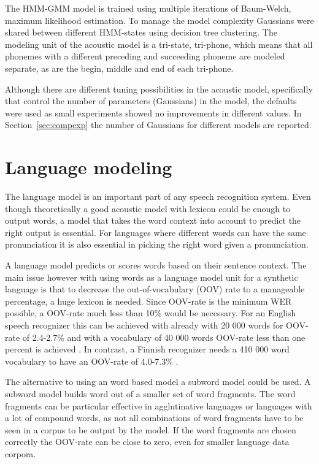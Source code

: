 \documentclass[b5paper]{article}
\newcommand{\ngram}{$n$-gram}
\begin{document}
The HMM-GMM model is trained using multiple iterations of Baum-Welch, maximum likelihood estimation. To manage the model complexity Gaussians were shared between different HMM-states using decision tree clustering. The modeling unit of the acoustic model is a tri-state, tri-phone, which means that all phonemes with a different preceding and succeeding phoneme are modeled separate, as are the begin, middle and end of each tri-phone.

Although there are different tuning possibilities in the acoustic model, specifically that control the number of parameters (Gaussians) in the model, the defaults were used as small experiments showed no improvements in different values. In Section~\ref{sec:compexp} the number of Gaussians for different models are reported.


\section{Language modeling}

The language model is an important part of any speech recognition system. Even though theoretically a good acoustic model with lexicon could be enough to output words, a model that takes the word context into account to predict the right output is essential. For languages where different words can have the same pronunciation it is also essential in picking the right word given a pronunciation. 


A language model predicts or scores words based on their sentence context. The main issue however with using words as a language model unit for a synthetic language is that to decrease the out-of-vocabulary (OOV) rate to a manageable percentage, a huge lexicon is needed. Since OOV-rate is the minimum WER possible, a OOV-rate much less than 10\% would be necessary. For an English speech recognizer this can be achieved with already with 20 000 words for OOV-rate of 2.4-2.7\% and with a vocabulary of 40 000 words OOV-rate less than one percent is achieved \cite{woodland19951994}. In contrast, a Finnish recognizer needs a 410 000 word vocabulary to have an OOV-rate of 4.0-7.3\% \cite{hirsimaki2006unlimited}.

The alternative to using an word based model a subword model could be used. A subword model builds word out of a smaller set of word fragments. The word fragments can be particular effective in agglutinative languages or languages with a lot of compound words, as not all combinations of word fragments have to be seen in a corpus to be output by the model. If the word fragments are chosen correctly the OOV-rate can be close to zero, even for smaller language data corpora.
\end{document}
